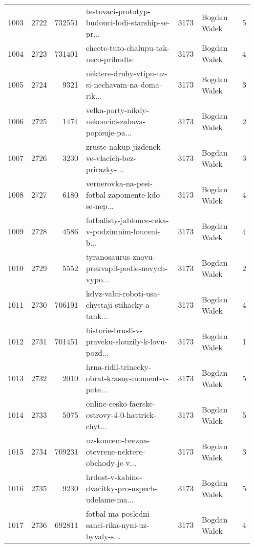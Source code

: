 \begin{tabular}{lrrlrlr}
1003 &       2722 &   732551 &  testovaci-prototyp-budouci-lodi-starship-se-pr... &     3173 &                 Bogdan Walek &               5 \\
1004 &       2723 &   731401 &              chcete-tuto-chalupu-tak-neco-prihodte &     3173 &                 Bogdan Walek &               4 \\
1005 &       2724 &     9321 &  nektere-druhy-vtipu-uz-si-nechavam-na-doma-rik... &     3173 &                 Bogdan Walek &               3 \\
1006 &       2725 &     1474 &  velka-party-nikdy-nekoncici-zabava-popisuje-pa... &     3173 &                 Bogdan Walek &               2 \\
1007 &       2726 &     3230 &  zruste-nakup-jizdenek-ve-vlacich-bez-prirazky-... &     3173 &                 Bogdan Walek &               3 \\
1008 &       2727 &     6180 &  vernerovka-na-pesi-fotbal-zapomente-kdo-se-nep... &     3173 &                 Bogdan Walek &               4 \\
1009 &       2728 &     4586 &  fotbalisty-jablonce-ceka-v-podzimnim-louceni-b... &     3173 &                 Bogdan Walek &               4 \\
1010 &       2729 &     5552 &  tyranosaurus-znovu-prekvapil-podle-novych-vypo... &     3173 &                 Bogdan Walek &               2 \\
1011 &       2730 &   706191 &  kdyz-valci-roboti-usa-chystaji-stihacky-a-tank... &     3173 &                 Bogdan Walek &               4 \\
1012 &       2731 &   701451 &  historie-brusli-v-praveku-slouzily-k-lovu-pozd... &     3173 &                 Bogdan Walek &               1 \\
1013 &       2732 &     2010 &  hrna-ridil-trinecky-obrat-krasny-moment-v-pate... &     3173 &                 Bogdan Walek &               5 \\
1014 &       2733 &     5075 &  online-cesko-faerske-ostrovy-4-0-hattrick-chyt... &     3173 &                 Bogdan Walek &               5 \\
1015 &       2734 &   709231 &  uz-koncem-brezna-otevrene-nektere-obchody-je-v... &     3173 &                 Bogdan Walek &               3 \\
1016 &       2735 &     9230 &  hrdost-v-kabine-dvacitky-pro-uspech-udelame-ma... &     3173 &                 Bogdan Walek &               5 \\
1017 &       2736 &   692811 &  fotbal-ma-posledni-sanci-rika-nyni-uz-byvaly-s... &     3173 &                 Bogdan Walek &               4 \\

\end{tabular}
